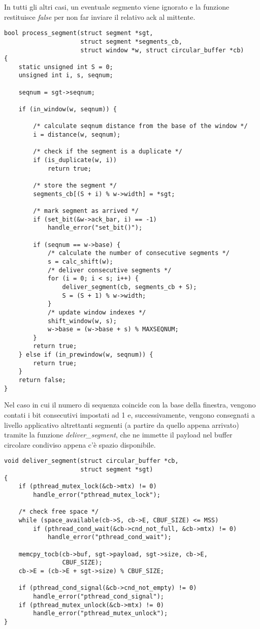 In tutti gli altri casi, un eventuale segmento viene ignorato e la funzione 
restituisce \emph{false} per non far inviare il relativo ack al mittente.
%
\begin{lstlisting}[title=transport.c]
bool process_segment(struct segment *sgt, 
                     struct segment *segments_cb,
                     struct window *w, struct circular_buffer *cb)
{
    static unsigned int S = 0;
    unsigned int i, s, seqnum;

    seqnum = sgt->seqnum;

    if (in_window(w, seqnum)) {

        /* calculate seqnum distance from the base of the window */
        i = distance(w, seqnum);

        /* check if the segment is a duplicate */
        if (is_duplicate(w, i))
            return true;

        /* store the segment */
        segments_cb[(S + i) % w->width] = *sgt;

        /* mark segment as arrived */
        if (set_bit(&w->ack_bar, i) == -1)
            handle_error("set_bit()");

        if (seqnum == w->base) {
            /* calculate the number of consecutive segments */
            s = calc_shift(w);
            /* deliver consecutive segments */
            for (i = 0; i < s; i++) {
                deliver_segment(cb, segments_cb + S);
                S = (S + 1) % w->width;
            }
            /* update window indexes */
            shift_window(w, s);
            w->base = (w->base + s) % MAXSEQNUM;
        }
        return true;
    } else if (in_prewindow(w, seqnum)) {
        return true;
    }
    return false;
}
\end{lstlisting}
%
Nel caso in cui il numero di sequenza coincide con la base della finestra,
vengono contati i bit consecutivi impostati ad 1 e, successivamente, 
vengono consegnati a livello applicativo altrettanti segmenti (a partire 
da quello appena arrivato) tramite la funzione \emph{deliver\_segment}, 
che ne immette il payload nel buffer circolare condiviso appena c'è spazio
disponibile.
%
\begin{lstlisting}[title=transport.c]
void deliver_segment(struct circular_buffer *cb, 
                     struct segment *sgt)
{
    if (pthread_mutex_lock(&cb->mtx) != 0)
        handle_error("pthread_mutex_lock");

    /* check free space */
    while (space_available(cb->S, cb->E, CBUF_SIZE) <= MSS) 
        if (pthread_cond_wait(&cb->cnd_not_full, &cb->mtx) != 0)
            handle_error("pthread_cond_wait");

    memcpy_tocb(cb->buf, sgt->payload, sgt->size, cb->E, 
                CBUF_SIZE);
    cb->E = (cb->E + sgt->size) % CBUF_SIZE;

    if (pthread_cond_signal(&cb->cnd_not_empty) != 0)
        handle_error("pthread_cond_signal");
    if (pthread_mutex_unlock(&cb->mtx) != 0)
        handle_error("pthread_mutex_unlock");
}
\end{lstlisting}
